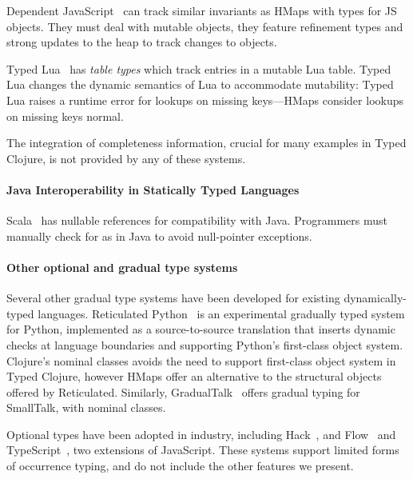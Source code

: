 Dependent JavaScript~\cite{Chugh:2012:DTJ} can track similar
invariants as HMaps with types for JS objects. They must deal with
mutable objects, they feature refinement types and strong updates to
the heap to track changes to objects.

Typed Lua~\cite{Maidl:2014:TLO} has \emph{table types} which track
entries in a mutable Lua table.  Typed Lua changes the dynamic
semantics of Lua to accommodate mutability: Typed Lua raises a runtime
error for lookups on missing keys---HMaps consider lookups on missing
keys normal.

The integration of completeness information, crucial for many examples
in Typed Clojure, is not provided by any of these systems.

\paragraph{Java Interoperability in Statically Typed Languages}
Scala~\cite{OCD+} has nullable references for compatibility with Java.
Programmers must manually check for
 as in Java to avoid null-pointer exceptions. 


\paragraph{Other optional and gradual type systems}
Several other gradual type
systems have been developed for existing
dynamically-typed languages.  Reticulated Python~\cite{Vitousek14} is
an experimental gradually typed system for Python, implemented as a
source-to-source translation that inserts dynamic checks at language
boundaries and supporting Python's first-class object system. 
Clojure's nominal classes avoids the need to support
first-class object system in Typed Clojure, however HMaps offer an alternative to
the structural objects offered by Reticulated. Similarly,
GradualTalk~\cite{gradualtalk} offers gradual typing for SmallTalk,
with nominal classes.

Optional types
have been  adopted in industry, including Hack~\cite{hack}, and Flow~\cite{flow} and
TypeScript~\cite{typescript}, two extensions of JavaScript. These
systems  support  limited forms of occurrence typing,
and do not include the other features we
present.



